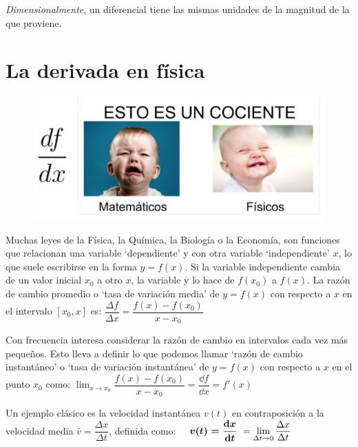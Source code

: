 \emph{Dimensionalmente}, un diferencial tiene las mismas unidades de la magnitud de la que proviene.



\vspace{1cm}
\section{La derivada en física}
\vspace{0.5cm}


\begin{figure}[H]
	\centering
	\includegraphics[width=.6\textwidth]{imagenes/T02IM01.png}
\end{figure}


Muchas leyes de la Física, la Química, la Biología o la Economía, son funciones que relacionan una variable `dependiente' y con otra variable `independiente' $x$, lo que suele escribirse en la forma $y = f(x)$. Si la variable independiente cambia de un valor inicial $x_0$ a otro $x$, la variable y lo hace de $f(x_0)$ a $f(x)$. La razón de cambio promedio o `tasa de variación media' de $y = f(x)$ con respecto a $x$ en el intervalo $[x_0,x]$ es: $\dfrac{\Delta f}{\Delta x}=\dfrac{f(x)-f(x_0)}{x-x_0}$

Con frecuencia interesa considerar la razón de cambio en intervalos cada vez más pequeños. Esto lleva a definir lo que podemos llamar `razón de cambio instantáneo' o `tasa de variación instantánea' de $y = f(x)$ con respecto a $x$ en el punto $x_0$ como: 
$\displaystyle \lim_{x\to x_0} \dfrac{f(x)-f(x_0)}{x-x_0} =\dfrac {\dd f}{\dd x}=f'(x)$

Un ejemplo clásico es la velocidad instantánea $v(t)$ en contraposición a la velocidad media $\bar v = \dfrac{\Delta x}{\Delta t}$, definida como:
$\quad  \displaystyle \boldsymbol{ v(t)= \dv{x}{t} } \ =\lim_{\Delta t\to 0} \dfrac{\Delta x}{\Delta t}$

